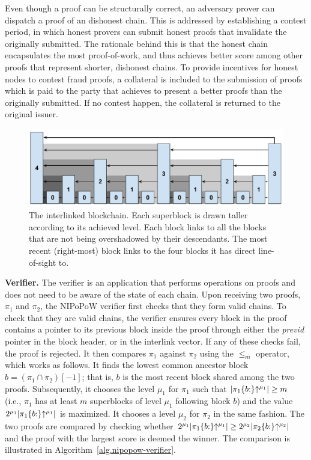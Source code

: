 Even though a proof can be structurally correct, an adversary prover can dispatch a
proof of an dishonest chain. This is addressed by establishing a contest
period, in which honest provers can submit honest proofs that invalidate
the originally submitted. The rationale behind this is that the honest chain
encapsulates the most proof-of-work, and thus achieves better score among
other proofs that represent shorter, dishonest chains. To provide incentives for honest
nodes to contest fraud proofs, a collateral is included to the submission of
proofs which is paid to the party that achieves to present a better proofs than
the originally submitted. If no contest happen, the collateral is returned to
the original issuer.


\begin{figure}[ht]
    \centering
    \includegraphics[width=0.9\columnwidth,keepaspectratio]{figures/prelims/level-shadows.pdf}
    \caption{The interlinked blockchain. Each superblock is drawn taller
    according to its achieved level. Each block links to all the blocks that are
    not being overshadowed by their descendants. The most recent (right-most)
    block links to the four blocks it has direct line-of-sight to.}
    \label{fig.hierarchy}
\end{figure}

\noindent \textbf{Verifier.} The verifier is an application that performs
operations on proofs and does not need to be aware of the state of each chain.
Upon receiving two proofs, $\pi_1$ and $\pi_2$, the NIPoPoW verifier first
checks that they form valid chains. To check that they are valid chains, the
verifier ensures every block in the proof contains a pointer to its previous
block inside the proof through either the \emph{previd} pointer in the block
header, or in the interlink vector. If any of these checks fail, the proof is
rejected.  It then compares $\pi_1$ against $\pi_2$ using the $\leq_m$
operator, which works as follows. It finds the lowest common ancestor block $b
= (\pi_1 \cap \pi_2)[-1]$; that is, $b$ is the most recent block shared among
the two proofs.  Subsequently, it chooses the level $\mu_1$ for $\pi_1$ such
that $\lvert \pi_1\{b{:}\}\negthickspace\uparrow^{\mu_1} \rvert \geq m$ (i.e., $\pi_1$ has at
least $m$ superblocks of level $\mu_1$ following block $b$) and the value
$2^{\mu_1} \lvert \pi_1\{b{:}\}\negthickspace\uparrow^{\mu_1} \rvert$ is maximized.  It
chooses a level $\mu_2$ for $\pi_2$ in the same fashion. The two proofs are
compared by checking whether $2^{\mu_1} \lvert \pi_1\{b{:}\}\negthickspace\uparrow^{\mu_1}
\rvert \geq 2^{\mu_2} \lvert \pi_2\{b{:}\}\negthickspace\uparrow^{\mu_2} \rvert$ and the
proof with the largest score is deemed the winner. The comparison is
illustrated in Algorithm~\ref{alg.nipopow-verifier}.

